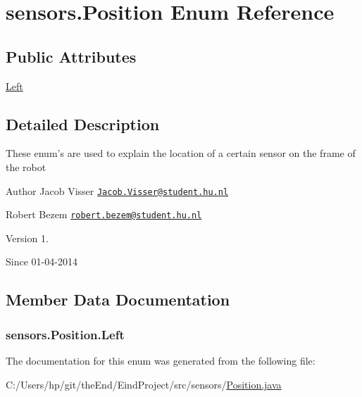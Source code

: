 \hypertarget{enumsensors_1_1_position}{\section{sensors.\-Position Enum Reference}
\label{enumsensors_1_1_position}
}
\subsection*{Public Attributes}
\begin{DoxyCompactItemize}
\item 
\hyperlink{enumsensors_1_1_position_a6f0d6987f9fb0f870c585227a2e40c27}{Left}
\end{DoxyCompactItemize}


\subsection{Detailed Description}
These enum's are used to explain the location of a certain sensor on the frame of the robot

\begin{DoxyAuthor}{Author}
Jacob Visser \href{mailto:Jacob.Visser@student.hu.nl}{\tt Jacob.\-Visser@student.\-hu.\-nl} 

Robert Bezem \href{mailto:robert.bezem@student.hu.nl}{\tt robert.\-bezem@student.\-hu.\-nl} 
\end{DoxyAuthor}
\begin{DoxyVersion}{Version}
1. 
\end{DoxyVersion}
\begin{DoxySince}{Since}
01-\/04-\/2014 
\end{DoxySince}


\subsection{Member Data Documentation}
\hypertarget{enumsensors_1_1_position_a6f0d6987f9fb0f870c585227a2e40c27}{
\subsubsection[{Left}]{\setlength{\rightskip}{0pt plus 5cm}sensors.\-Position.\-Left}}\label{enumsensors_1_1_position_a6f0d6987f9fb0f870c585227a2e40c27}


The documentation for this enum was generated from the following file\-:\begin{DoxyCompactItemize}
\item 
C\-:/\-Users/hp/git/the\-End/\-Eind\-Project/src/sensors/\hyperlink{_position_8java}{Position.\-java}\end{DoxyCompactItemize}
